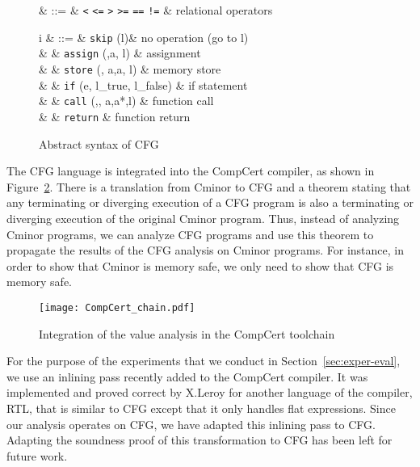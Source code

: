 \begin{figure}
\begin{syntaxleft}
\cmp &  ::=  & \hbox{{\tt <}} \alt \hbox{{\tt <=}} \alt \hbox{{\tt >}} \alt \hbox{{\tt >=}} 
               \alt \hbox{{\tt ==}} \alt \hbox{{\tt !=}}   & relational operators 

i & ::=  & {\tt skip} (l)& no operation (go to l)\\
  & \alt & {\tt assign} (\id,a, l) & assignment\\
  & \alt & {\tt store} (\chunk, a,a, l) & memory store \\ 
  & \alt & {\tt if} (e, l_{true}, l_{false})  & if statement\\
  & \alt & {\tt call} (\sig,\opt{\id}, a,a*,l) & function call \\
  & \alt & {\tt return}  & function return

\end{syntaxleft}
\caption{Abstract syntax of CFG}
\label{fig:syntax}
\end{figure}



 
The CFG language is integrated into the CompCert compiler, as shown in Figure~\ref{fig:chain}.
There is a translation from Cminor to CFG and a theorem stating that
any terminating or diverging execution of a CFG program is also a
terminating or diverging execution of the original Cminor program.
Thus, instead of analyzing Cminor programs, we can analyze CFG programs
and use this theorem to propagate the results of the CFG analysis on Cminor programs.
For instance, in order to show that Cminor is memory safe, we only
need to show that CFG is memory safe. 






\begin{figure}
  \centering
\texttt{[image: CompCert\_chain.pdf]}  
\caption{Integration of the value analysis in the CompCert toolchain}
 \label{fig:chain}
\end{figure}

For the purpose of the experiments that we conduct in
Section~\ref{sec:exper-eval}, we use an inlining pass recently added
to the CompCert compiler. It was implemented and
proved correct by X.Leroy for another language
of the compiler, RTL, that is similar to CFG except
that it only handles flat expressions. Since our analysis operates on CFG, we have adapted this 
inlining pass to CFG. Adapting
the soundness proof of this transformation to CFG has been left for future work.

